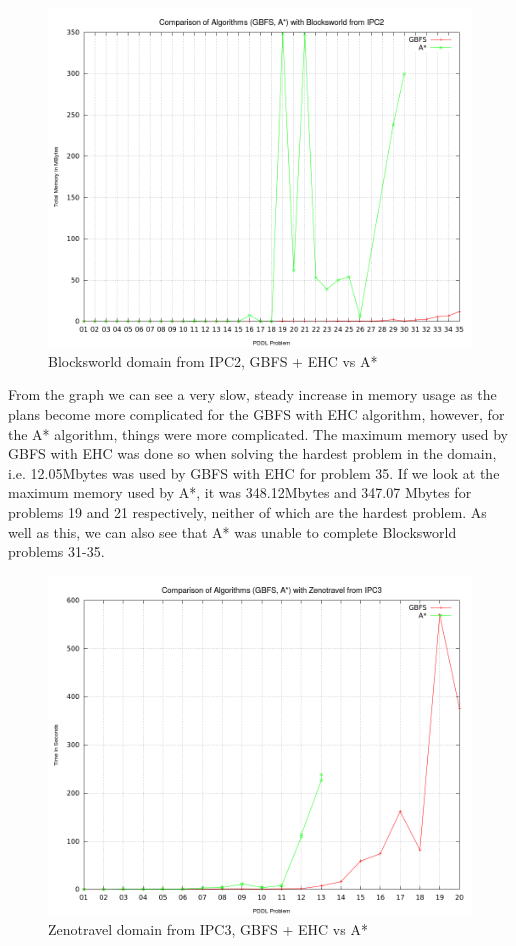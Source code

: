 \begin{figure}[!htb]
    \centering
    \includegraphics[scale=0.35]{BlocksworldMemory.png}
    \caption{Blocksworld domain from IPC2, GBFS + EHC vs A* }
    \label{fig:BlocksworldDomainMemory}
\end{figure}
From the graph we can see a very slow, steady increase in memory usage as the plans become more complicated for the GBFS with EHC algorithm, however, for the A* algorithm, things were more complicated. The maximum memory used by GBFS with EHC was done so when solving the hardest problem in the domain, i.e. 12.05Mbytes was used by GBFS with EHC for problem 35. If we look at the maximum memory used by A*, it was 348.12Mbytes and 347.07 Mbytes for problems 19 and 21 respectively, neither of which are the hardest problem. As well as this, we can also see that A* was unable to complete Blocksworld problems 31-35.
\begin{figure}[!htb]
    \centering
    \includegraphics[scale=0.35]{ZenoTime.png}
    \caption{Zenotravel domain from IPC3, GBFS + EHC vs A* }
    \label{fig:ZenoTravelDomainTime}
\end{figure}
